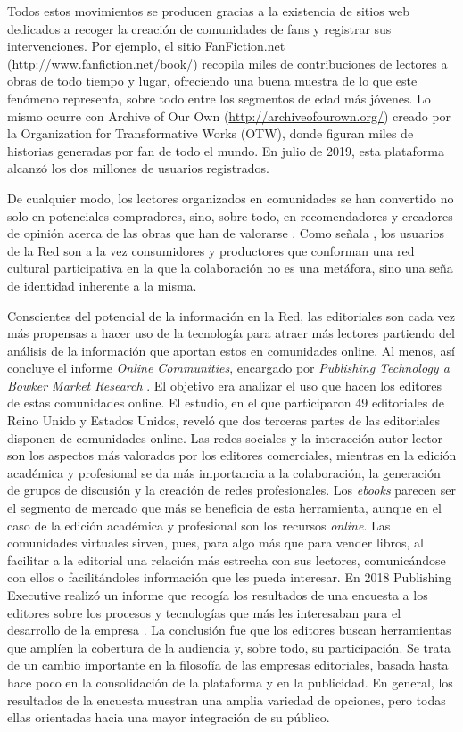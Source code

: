 \documentclass[spanish]{textolivre}
\begin{document}
Todos estos movimientos se producen gracias a la existencia de sitios web dedicados a recoger la creación de comunidades de fans y registrar sus intervenciones. Por ejemplo, el sitio FanFiction.net (\url{http://www.fanfiction.net/book/}) recopila miles de contribuciones de lectores a obras de todo tiempo y lugar, ofreciendo una buena muestra de lo que este fenómeno representa, sobre todo entre los segmentos de edad más jóvenes. Lo mismo ocurre con Archive of Our Own (\url{http://archiveofourown.org/}) creado por la Organization for Transformative Works (OTW), donde figuran miles de historias generadas por fan de todo el mundo. En julio de 2019, esta plataforma alcanzó los dos millones de usuarios registrados. 

De cualquier modo, los lectores organizados en comunidades se han convertido no solo en potenciales compradores, sino, sobre todo, en recomendadores y creadores de opinión acerca de las obras que han de valorarse \cite{pelosi_modelo_2019}. Como señala \textcite{cassany_en_linea._2012}, los usuarios de la Red son a la vez consumidores y productores que conforman una red cultural participativa en la que la colaboración no es una metáfora, sino una seña de identidad inherente a la misma.

Conscientes del potencial de la información en la Red, las editoriales son cada vez más propensas a hacer uso de la tecnología para atraer más lectores partiendo del análisis de la información que aportan estos en comunidades online. Al menos, así concluye el informe \textit{Online Communities}, encargado por \textit{Publishing Technology a Bowker Market Research} \cite{tappuni_are_2013}. El objetivo era analizar el uso que hacen los editores de estas comunidades online. El estudio, en el que participaron 49 editoriales de Reino Unido y Estados Unidos, reveló que dos terceras partes de las editoriales disponen de comunidades online. Las redes sociales y la interacción autor-lector son los aspectos más valorados por los editores comerciales, mientras en la edición académica y profesional se da más importancia a la colaboración, la generación de grupos de discusión y la creación de redes profesionales. Los \textit{ebooks} parecen ser el segmento de mercado que más se beneficia de esta herramienta, aunque en el caso de la edición académica y profesional son los recursos \textit{online}. Las comunidades virtuales sirven, pues, para algo más que para vender libros, al facilitar a la editorial una relación más estrecha con sus lectores, comunicándose con ellos o facilitándoles información que les pueda interesar. En 2018 Publishing Executive realizó un informe que recogía los resultados de una encuesta a los editores sobre los procesos y tecnologías que más les interesaban para el desarrollo de la empresa \cite{houston_top_2018}. La conclusión fue que los editores buscan herramientas que amplíen la cobertura de la audiencia y, sobre todo, su participación. Se trata de un cambio importante en la filosofía de las empresas editoriales, basada hasta hace poco en la consolidación de la plataforma y en la publicidad. En general, los resultados de la encuesta muestran una amplia variedad de opciones, pero todas ellas orientadas hacia una mayor integración de su público. 
\end{document}
